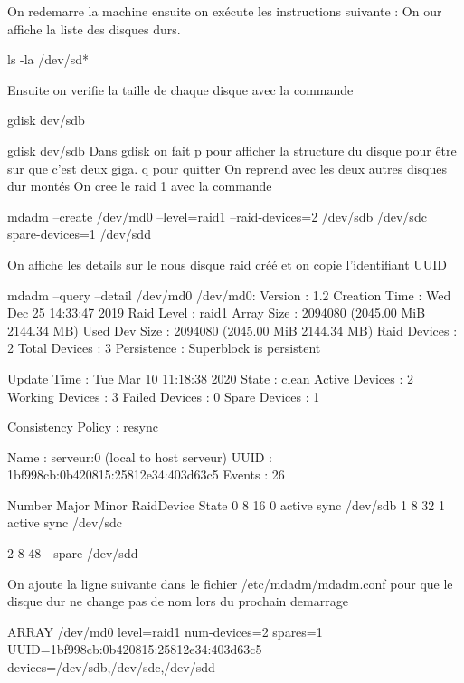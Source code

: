 \documentclass[a4paper,12pt,french]{report} %
\begin{document}
On redemarre la machine ensuite on exécute les instructions suivante :
On our affiche la liste des disques durs. 
\begin{exempleConsole}
ls -la /dev/sd* 
\end{exempleConsole}
Ensuite on verifie la taille de chaque disque avec la commande
\begin{exempleConsole}
gdisk dev/sdb
\end{exempleConsole}
gdisk dev/sdb 
 Dans gdisk on fait p pour afficher la structure du disque pour être sur que c'est deux giga.
q  pour quitter On reprend avec les deux autres disques dur montés
 On cree le raid 1 avec la commande  
\begin{exempleConsole}
mdadm --create /dev/md0 --level=raid1 --raid-devices=2 /dev/sdb /dev/sdc spare-devices=1 /dev/sdd
\end{exempleConsole}
On affiche les details sur le nous disque raid créé et on copie l'identifiant UUID
\begin{exempleConsole}
mdadm --query --detail /dev/md0
/dev/md0:
           Version : 1.2
     Creation Time : Wed Dec 25 14:33:47 2019
        Raid Level : raid1
        Array Size : 2094080 (2045.00 MiB 2144.34 MB)
     Used Dev Size : 2094080 (2045.00 MiB 2144.34 MB)
      Raid Devices : 2
     Total Devices : 3
       Persistence : Superblock is persistent

       Update Time : Tue Mar 10 11:18:38 2020
             State : clean
    Active Devices : 2
   Working Devices : 3
    Failed Devices : 0
     Spare Devices : 1

Consistency Policy : resync

              Name : serveur:0  (local to host serveur)
              UUID : 1bf998cb:0b420815:25812e34:403d63c5
            Events : 26

    Number   Major   Minor   RaidDevice State
       0       8       16        0      active sync   /dev/sdb
       1       8       32        1      active sync   /dev/sdc

       2       8       48        -      spare   /dev/sdd

\end{exempleConsole}
On ajoute la ligne suivante dans le fichier /etc/mdadm/mdadm.conf pour que le disque dur ne change pas de nom lors du prochain demarrage
\begin{exempleConsole}
ARRAY /dev/md0 level=raid1 num-devices=2 spares=1 UUID=1bf998cb:0b420815:25812e34:403d63c5 devices=/dev/sdb,/dev/sdc,/dev/sdd
\end{exempleConsole}
\end{document}

